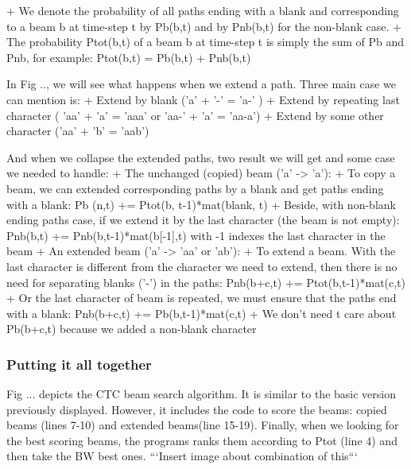       + We denote the probability of all paths ending with a blank and corresponding to a beam b at time-step t 
      by Pb(b,t) and by Pnb(b,t) for the non-blank case.
      + The probability Ptot(b,t) of a beam b at time-step t is simply the sum of Pb and Pnb, for example:
      Ptot(b,t) = Pb(b,t) + Pnb(b,t)

      In Fig .., we will see what happens when we extend a path. Three main case we can mention
      is: 
        + Extend by blank ('a' + '-' = 'a-' )
        + Extend by repeating last character ( 'aa' + 'a' = 'aaa' or 'aa-' + 'a' = 'aa-a')
        + Extend by some other character ('aa' + 'b' = 'aab')
      
      And when we collapse the extended paths, two result we will get and some case we needed to handle:
        + The unchanged (copied) beam ('a' -> 'a'):
          + To copy a beam, we can extended corresponding paths by a blank and get
          paths ending with a blank: Pb (n,t) += Ptot(b, t-1)*mat(blank, t)
          + Beside, with non-blank ending paths case, if we extend it by the last
          character (the beam is not empty): Pnb(b,t) += Pnb(b,t-1)*mat(b[-1],t)
          with -1 indexes the last character in the beam
        + An extended beam ('a' -> 'aa' or 'ab'):
          + To extend a beam. With the last character is different from the character we need
          to extend, then there is no need for separating blanks ('-') in the paths:
            Pnb(b+c,t) += Ptot(b,t-1)*mat(c,t)
          + Or the last character of beam is repeated, we must ensure that the paths
          end with a blank: Pnb(b+c,t) += Pb(b,t-1)*mat(c,t)
          + We don't need t care about Pb(b+c,t) because we added a non-blank character
      \subsubsection{ Putting it all together }
        Fig ... depicts the CTC beam search algorithm. It is similar to the basic version
        previously displayed. However, it includes the code to score the beams: copied beams
        (lines 7-10) and extended beams(line 15-19). Finally, when we looking for the best scoring
        beams, the programs ranks them according to Ptot (line 4) and then take the BW best ones.
        ```Insert image about combination of this```
      

